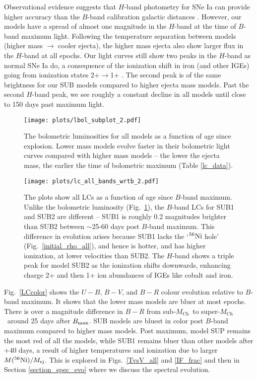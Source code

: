 \documentclass[useAMS,usenatbib,useasmath]{mnras}
\newcommand{\Mch}{\hbox{$M_{\text{Ch}}$}}
\newcommand{\elem}[2][default]{$^{#1}{\rm #2}$}
\def\fig{Fig.}
\def\figs{Figs.}
\begin{document}
Observational evidence suggests that $H$-band photometry for SNe Ia can provide higher accuracy than the $B$-band calibration galactic distances \citep{Krisciunas2004,Krisciunas2007,Wood-Vasey2008}. However, our models have a spread of almost one magnitude in the $H$-band at the time of $B$-band maximum light. Following the temperature separation between models (higher mass $\rightarrow$ cooler ejecta), the higher mass ejecta also show larger flux in the $H$-band at all epochs. Our light curves still show two peaks in the $H$-band as normal SNe Ia do, a consequence of the ionization shift in iron (and other IGEs) going from ionization states 2+$\rightarrow$1+ \citep{Kasen2006}. The second peak is of the same brightness for our SUB models compared to higher ejecta mass models. Past the second $H$-band peak, we see roughly a constant decline in all models until close to 150 days past maximum light. 

\begin{figure*} 
\centering
\texttt{[image: plots/lbol\_subplot\_2.pdf]}
\caption{The bolometric luminosities for all models as a function of age since explosion. Lower mass models evolve faster in their bolometric light curves compared with higher mass models -- the lower the ejecta mass, the earlier the time of bolometric maximum (Table \ref{lc_data}).}
\label{LogLbol}
\end{figure*} 
\begin{figure*} 
\hspace*{-0.75cm}\texttt{[image: plots/lc\_all\_bands\_wrtb\_2.pdf]}
\caption[]{The plots show all LCs as a function of age since $B$-band maximum. Unlike the bolometric luminosity (\fig~\ref{LogLbol}), the $B$-band LCs for SUB1 and SUB2 are different -- SUB1 is roughly 0.2 magnitudes brighter than SUB2 between $\sim$25-60 days post $B$-band maximum. This difference in evolution arises because SUB1 lacks the `\elem[56]{Ni} hole' (\fig~\ref{initial_rho_all}), and hence is hotter, and has higher ionization, at lower velocities than SUB2. The $H$-band shows a triple peak for model SUB2 as the ionization shifts downwards, enhancing charge 2+ and then 1+ ion abundances of IGEs like cobalt and iron.}
\label{lc_wrtb}
\end{figure*}

\fig~\ref{LCcolor} shows the $U-B$, $B-V$, and $B-R$ colour evolution relative to $B$-band maximum. It shows that the lower mass models are bluer at most epochs. There is over a magnitude difference in $B-R$ from sub-\Mch\ to super-\Mch\ around 25 days after $B_{\rm max}$. SUB models are bluest in color post $B$-band maximum compared to higher mass models. Post maximum, model SUP remains the most red of all the models, while SUB1 remains bluer than other models after $+40$ days, a result of higher temperatures and ionization due to larger $M(^{56}{\rm Ni})/M_{\rm ej}$. This is explored in \figs~\ref{TvsV_all} and \ref{IF_frac} and then in Section \ref{section_spec_evo} where we discuss the spectral evolution. 
\end{document}
